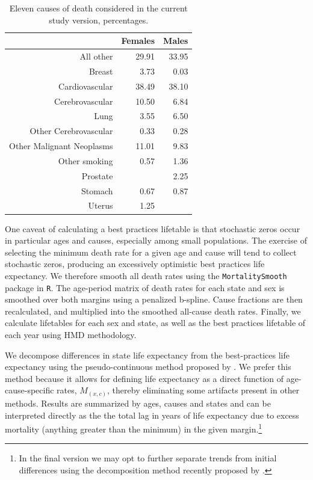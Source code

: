 \documentclass[11pt,oneside,a4paper]{article} %
\begin{document}
\begin{table}[ht]
\centering
\caption{Eleven causes of death considered in the current study version,
percentages.}
\label{tab:desc}
\begin{tabular}{rrr}
 & Females & Males \\ 
  \hline
All other & 29.91 & 33.95 \\ 
  Breast & 3.73 & 0.03 \\ 
  Cardiovascular & 38.49 & 38.10 \\ 
  Cerebrovascular & 10.50 & 6.84 \\ 
  Lung & 3.55 & 6.50 \\ 
  Other Cerebrovascular & 0.33 & 0.28 \\ 
  Other Malignant Neoplasms & 11.01 & 9.83 \\ 
  Other smoking & 0.57 & 1.36 \\ 
  Prostate &  & 2.25 \\ 
  Stomach & 0.67 & 0.87 \\ 
  Uterus & 1.25 &  \\ 
   \hline
\end{tabular}
\end{table}

One caveat of calculating a best practices lifetable is that stochastic zeros
occur in particular ages and causes, especially among small populations. The
exercise of selecting the minimum death rate for a given age and cause will tend
to collect stochastic zeros, producing an excessively optimistic best practices
life expectancy. We therefore smooth all death rates using
the \texttt{MortalitySmooth} package \citep{GC2012} in \texttt{R}. The age-period
matrix of death rates for each state and sex is smoothed over both margins
using a penalized b-spline. Cause fractions are then recalculated, and
multiplied into the smoothed all-cause death rates. Finally, we calculate
lifetables for each sex and state, as well as the best practices lifetable of
each year using HMD methodology.

We decompose differences in state life expectancy from the best-practices life
expectancy using the pseudo-continuous method proposed by
\citet{horiuchi2008decomposition}. We prefer this method because it allows for
defining life expectancy as a direct function of age-cause-specific rates,
$M_{(x,c)}$, thereby eliminating some artifacts present in other methods.
Results are summarized by ages, causes and states and can be interpreted
directly as the the total lag in years of life expectancy due to excess
mortality (anything greater than the minimum) in the given margin.\footnote{In
the final version we may opt to further separate trends from initial
differences using the decomposition method recently proposed by
\citet{DimaDecomp2014}.}
\end{document}
